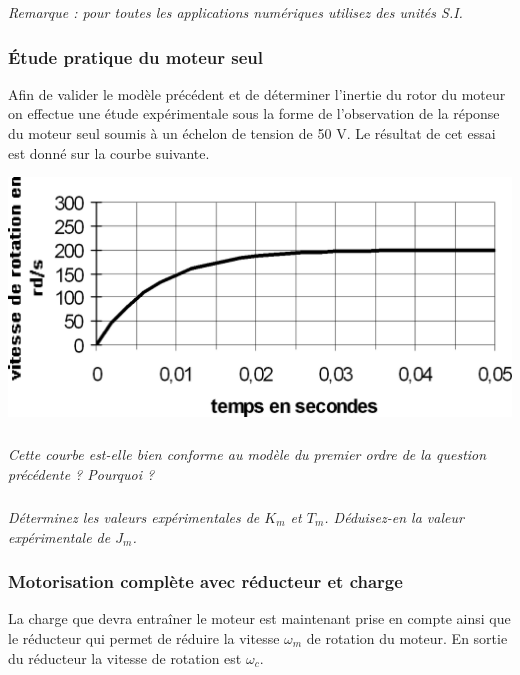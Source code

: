 \documentclass[11pt,oneside]{article}
\begin{document}

\textit{Remarque : pour toutes les applications numériques utilisez des unités S.I.}



\subsubsection*{Étude pratique du moteur seul}

Afin de valider le modèle précédent et de déterminer l’inertie du rotor du moteur on effectue une étude expérimentale sous la forme de l’observation de la réponse du moteur seul soumis à un échelon de tension de 50 V. Le résultat de cet essai est donné sur la courbe suivante.

\begin{center}
\includegraphics[width=.5\textwidth]{png/fig_02}
\end{center}

\subparagraph{}
\textit{Cette courbe est-elle bien conforme au modèle du premier ordre de la question précédente ? Pourquoi ?}


\subparagraph{}
\textit{Déterminez les valeurs expérimentales de $K_m$ et $T_m$. Déduisez-en la valeur expérimentale de $J_m$. }



\subsubsection*{Motorisation complète avec réducteur et charge}

La charge que devra entraîner le moteur est maintenant prise en compte ainsi que le réducteur qui permet de réduire la vitesse $\omega_m$ de rotation du moteur. En sortie du réducteur la vitesse de rotation est $\omega_c$.
\end{document}
